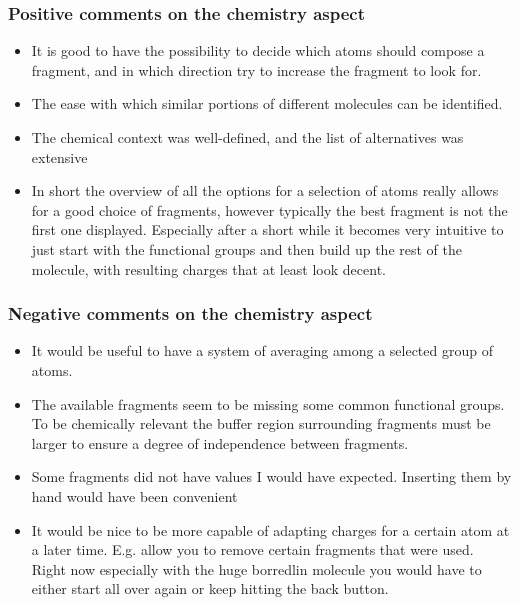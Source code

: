 \subsubsection{Positive comments on the chemistry aspect}
\begin{itemize}
\item It is good to have the possibility to decide which atoms should compose a fragment, and in which direction try to increase the fragment to look for.



\item The ease with which similar portions of different molecules can be identified.

\item The chemical context was well-defined, and the list of alternatives was extensive

\item In short the overview of all the options for a selection of atoms really allows for a good choice of fragments, however typically the best fragment is not the first one displayed. Especially after a short while it becomes very intuitive to just start with the functional groups and then build up the rest of the molecule, with resulting charges that at least look decent.

\end{itemize}


\subsubsection{Negative comments on the chemistry aspect}
\begin{itemize}
\item It would be useful to have a system of averaging among a selected group of atoms.

\item The available fragments seem to be missing some common functional groups. To be chemically relevant the buffer region surrounding fragments must be larger to ensure a degree of independence between fragments. 

\item Some fragments did not have values I would have expected. Inserting them by hand would have been convenient

\item It would be nice to be more capable of adapting charges for a certain atom at a later time. E.g. allow you to remove certain fragments that were used. Right now especially with the huge borredlin molecule you would have to either start all over again or keep hitting the back button. 

\end{itemize}


